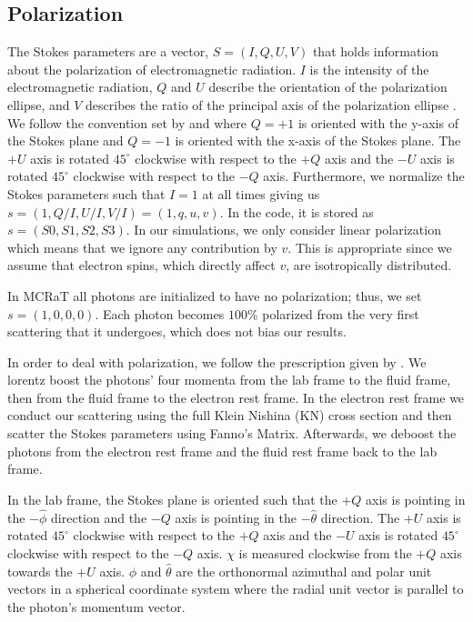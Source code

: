 \documentclass[12pt,a4paper]{article}
\begin{document}
\subsection{Polarization}\label{pol}
The Stokes parameters are a vector, $S=(I, Q, U, V)$ that holds information about the polarization of electromagnetic radiation. $I$ is the intensity of the electromagnetic radiation, $Q$ and $U$ describe the orientation of the polarization ellipse, and $V$ describes the ratio of the principal axis of the polarization ellipse \citep{Rybiki_Lightman}. {We follow the convention set by \cite{McMaster:1961aa} and  \cite{lundman2014polarization}
where $Q=+1$ is oriented with the y-axis of the Stokes plane and $Q=-1$ is oriented with the x-axis of the Stokes plane. The $+U$ axis is rotated $45^\circ$ clockwise with respect to the $+Q$ axis and the  $-U$ axis is rotated $45^\circ$ clockwise with respect to the $-Q$ axis. }Furthermore, we normalize the Stokes parameters such that $I=1$ at all times giving us $s=(1, Q/I, U/I, V/I)=(1,q,u,v)$. In the code, it is stored as $s=(S0, S1, S2, S3)$. In our simulations, we only consider linear polarization which means that we ignore any contribution by $v$. This is appropriate since we assume that electron spins, which directly affect $v$, are isotropically distributed.

In MCRaT all photons are initialized to have no polarization; thus, we set $s=(1,0,0,0)$. Each photon becomes $100$\% polarized from the very first scattering that it undergoes, which does not bias our results. 

In order to deal with polarization, we follow the prescription given by \cite{lundman2014polarization}. We lorentz boost the photons' four momenta from the lab frame to the fluid frame, then from the fluid frame to the electron rest frame. In the electron rest frame we conduct our scattering using the full Klein Nishina (KN) cross section and then scatter the Stokes parameters using Fanno's Matrix. Afterwards, we deboost the photons from the electron rest frame and the fluid rest frame back to the lab frame. 

{In the lab frame, the Stokes plane is oriented such that the $+Q$ axis is pointing in the $-\hat{\phi}$ direction and the $-Q$ axis is pointing in the $-\hat{\theta}$ direction. The $+U$ axis is rotated $45^\circ$ clockwise with respect to the $+Q$ axis and the  $-U$ axis is rotated $45^\circ$ clockwise with respect to the $-Q$ axis. $\chi$ is measured clockwise from the $+Q$ axis towards the $+U$ axis. $\hat{\phi}$ and $\hat{\theta}$ are the orthonormal azimuthal and polar unit vectors in a spherical coordinate system where the radial unit vector is parallel to the photon's momentum vector.} 
\end{document}
